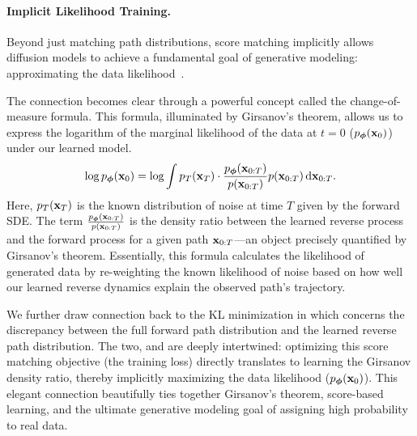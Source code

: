 \paragraph{Implicit Likelihood Training.}
Beyond just matching path distributions, score matching implicitly allows diffusion models to achieve a fundamental goal of generative modeling: approximating the data likelihood~\citep{song2021maximum}. 

The connection becomes clear through a powerful concept called the change-of-measure formula. This formula, illuminated by Girsanov's theorem, allows us to express the logarithm of the marginal likelihood of the data at $t=0$ ($p_{\bm{\phi}}({\mathbf{x}}_0)$) under our learned model.
\begin{align}\label{eq:girsanov-likelihood}
    \log p_{\bm{\phi}}({\mathbf{x}}_0) = \log \int p_T({\mathbf{x}}_T) \cdot \frac{p_{\bm{\phi}}({\mathbf{x}}_{0:T})}{p({\mathbf{x}}_{0:T})} p({\mathbf{x}}_{0:T}) \mathop{}\!\mathrm{d} {\mathbf{x}}_{0:T}.
\end{align}
Here, $p_T({\mathbf{x}}_T)$ is the known distribution of noise at time $T$ given by the forward SDE. The term $\frac{p_{\bm{\phi}}({\mathbf{x}}_{0:T})}{p({\mathbf{x}}_{0:T})}$ is the density ratio between the learned reverse process and the forward process for a given path ${\mathbf{x}}_{0:T}$—an object precisely quantified by Girsanov's theorem. Essentially, this formula calculates the likelihood of generated data by re-weighting the known likelihood of noise based on how well our learned reverse dynamics explain the observed path's trajectory.

We further draw connection back to the KL minimization in  which concerns the discrepancy between the full forward path distribution and the learned reverse path distribution. The two,  and  are deeply intertwined: optimizing this score matching objective (the training loss) directly translates to learning the Girsanov density ratio, thereby implicitly maximizing the data likelihood ($p_{\bm{\phi}}({\mathbf{x}}_0)$). This elegant connection beautifully ties together Girsanov’s theorem, score-based learning, and the ultimate generative modeling goal of assigning high probability to real data.
